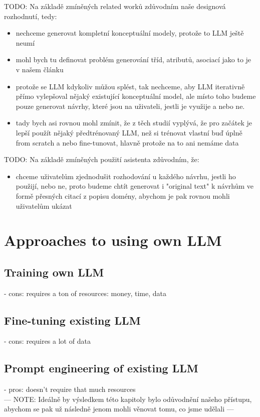 TODO: Na základě zmíněných related worků zdůvodním naše designová rozhodnutí, tedy:
\begin{itemize}
\item nechceme generovat kompletní konceptuální modely, protože to LLM ještě neumí
\item mohl bych tu definovat problém generování tříd, atributů, asociací jako to je v našem článku
\item protože se LLM kdykoliv můžou splést, tak nechceme, aby LLM iterativně přímo vylepšoval nějaký existující konceptuální model, ale místo toho budeme pouze generovat návrhy, které jsou na uživateli, jestli je využije a nebo ne.
\item tady bych asi rovnou mohl zmínit, že z těch studií vyplývá, že pro začátek je lepší použít nějaký předtrénovaný LLM, než si trénovat vlastní buď úplně from scratch a nebo fine-tunovat, hlavně protože na to ani nemáme data \\
\end{itemize}

TODO: Na základě zmíněných použití asistenta zdůvodním, že:
\begin{itemize}
\item chceme uživatelům zjednodušit rozhodování u každého návrhu, jestli ho použijí, nebo ne, proto budeme chtít generovat i "original text" k návrhům ve formě přesných citací z popisu domény, abychom je pak rovnou mohli uživatelům ukázat \\
\end{itemize}


\section{Approaches to using own LLM}

\subsection{Training own LLM}
- cons: requires a ton of resources: money, time, data


\subsection{Fine-tuning existing LLM}
- cons: requires a lot of data


\subsection{Prompt engineering of existing LLM}
- pros: doesn't require that much resources \\


--- NOTE: Ideálně by výsledkem této kapitoly bylo odůvodnění našeho přístupu, abychom se pak už následně jenom mohli věnovat tomu, co jsme udělali ---